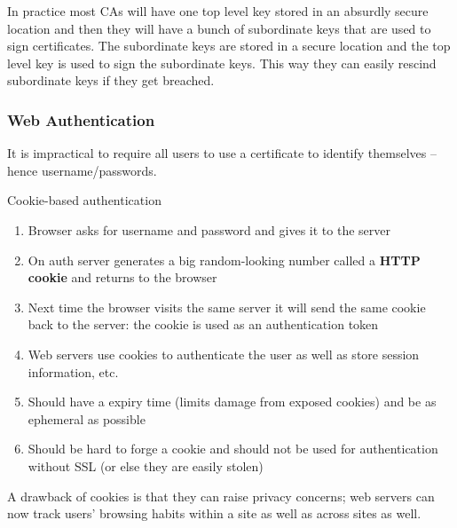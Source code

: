 \documentclass[../notes.tex]{subfiles}
\begin{document}
In practice most CAs will have one top level key stored in an absurdly secure location and then they will have a bunch of subordinate keys that are used to sign certificates. The subordinate keys are stored in a secure location and the top level key is used to sign the subordinate keys. This way they can easily rescind subordinate keys if they get breached.


\subsubsection{Web Authentication}

It is impractical to require all users to use a certificate to identify themselves -- hence username/passwords.


\begin{definition}
    Cookie-based authentication


    \begin{enumerate}
        \item Browser asks for username and password and gives it to the server
        \item On auth server generates a big random-looking number called a \textbf{HTTP cookie} and returns to the browser
        \item Next time the browser visits the same server it will send the same cookie back to the server: the cookie is used as an authentication token
        \item Web servers use cookies to authenticate the user as well as store session information, etc.
        \item Should have a expiry time (limits damage from exposed cookies) and be as ephemeral as possible
        \item Should be hard to forge a cookie and should not be used for authentication without SSL (or else they are easily stolen)
    \end{enumerate}

    A drawback of cookies is that they can raise privacy concerns; web servers can now track users' browsing habits within a site as well as across sites as well.
    
\end{definition}

\end{document}
